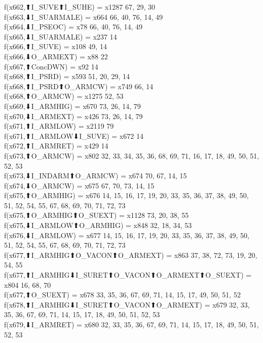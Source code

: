 f(x662,⬆I_SUVE⬆I_SUHE) = x1287 {67, 29, 30} \\
f(x663,⬇I_SUARMALE) = x664 {66, 40, 76, 14, 49} \\
f(x664,⬇I_PSEOC) = x78 {66, 40, 76, 14, 49} \\
f(x665,⬇I_SUARMALE) = x237 {14} \\
f(x666,⬆I_SUVE) = x108 {49, 14} \\
f(x666,⬇O_ARMEXT) = x88 {22} \\
f(x667,⬆ConcDWN) = x92 {14} \\
f(x668,⬆I_PSRD) = x593 {51, 20, 29, 14} \\
f(x668,⬆I_PSRD⬆O_ARMCW) = x749 {66, 14} \\
f(x668,⬆O_ARMCW) = x1275 {52, 53} \\
f(x669,⬇I_ARMHIG) = x670 {73, 26, 14, 79} \\
f(x670,⬇I_ARMEXT) = x426 {73, 26, 14, 79} \\
f(x671,⬆I_ARMLOW) = x2119 {79} \\
f(x671,⬆I_ARMLOW⬇I_SUVE) = x672 {14} \\
f(x672,⬆I_ARMRET) = x429 {14} \\
f(x673,⬆O_ARMCW) = x802 {32, 33, 34, 35, 36, 68, 69, 71, 16, 17, 18, 49, 50, 51, 52, 53} \\
f(x673,⬇I_INDARM⬆O_ARMCW) = x674 {70, 67, 14, 15} \\
f(x674,⬇O_ARMCW) = x675 {67, 70, 73, 14, 15} \\
f(x675,⬆O_ARMHIG) = x676 {14, 15, 16, 17, 19, 20, 33, 35, 36, 37, 38, 49, 50, 51, 52, 54, 55, 67, 68, 69, 70, 71, 72, 73} \\
f(x675,⬆O_ARMHIG⬆O_SUEXT) = x1128 {73, 20, 38, 55} \\
f(x675,⬇I_ARMLOW⬆O_ARMHIG) = x848 {32, 18, 34, 53} \\
f(x676,⬇I_ARMLOW) = x677 {14, 15, 16, 17, 19, 20, 33, 35, 36, 37, 38, 49, 50, 51, 52, 54, 55, 67, 68, 69, 70, 71, 72, 73} \\
f(x677,⬆I_ARMHIG⬆O_VACON⬆O_ARMEXT) = x863 {37, 38, 72, 73, 19, 20, 54, 55} \\
f(x677,⬆I_ARMHIG⬇I_SURET⬆O_VACON⬆O_ARMEXT⬆O_SUEXT) = x804 {16, 68, 70} \\
f(x677,⬆O_SUEXT) = x678 {33, 35, 36, 67, 69, 71, 14, 15, 17, 49, 50, 51, 52} \\
f(x678,⬆I_ARMHIG⬇I_SURET⬆O_VACON⬆O_ARMEXT) = x679 {32, 33, 35, 36, 67, 69, 71, 14, 15, 17, 18, 49, 50, 51, 52, 53} \\
f(x679,⬇I_ARMRET) = x680 {32, 33, 35, 36, 67, 69, 71, 14, 15, 17, 18, 49, 50, 51, 52, 53} \\
